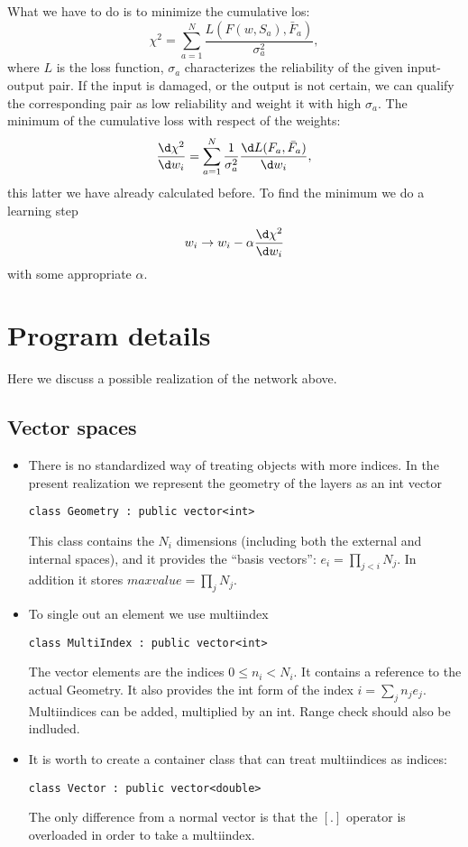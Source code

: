 \documentclass{article}
\begin{document}
What we have to do is to minimize the cumulative los:
\begin{equation}
  \chi^2 = \sum_{a=1}^N \frac{L(F(w,S_a),\bar F_a)}{\sigma_a^2},
\end{equation}
where $L$ is the loss function, $\sigma_a$ characterizes the
reliability of the given input-output pair. If the input is damaged,
or the output is not certain, we can qualify the corresponding pair as
low reliability and weight it with high $\sigma_a$. The minimum of the
cumulative loss with respect of the weights:
\begin{equation}
  \frac{\d\chi^2}{\d w_i} = \sum_{a=1}^N \frac{1}{\sigma_a^2}
  \frac{\d L(F_a,\bar F_a)}{\d w_i},
\end{equation}
this latter we have already calculated before. To find the minimum we
do a learning step
\begin{equation}
  w_i \to w_i - \alpha \frac{\d\chi^2}{\d w_i} 
\end{equation}
with some appropriate $\alpha$. 


\section{Program details}

Here we discuss a possible realization of the network above.

\subsection{Vector spaces}

\begin{itemize}
\item There is no standardized way of treating objects with more indices. In
  the present realization we represent the geometry of the layers as
  an int vector 
  \begin{center}
    \texttt{class Geometry : public vector<int>}  
  \end{center}
  This class contains the $N_i$ dimensions (including both the
  external and internal spaces), and it provides the ``basis
  vectors'': $e_i = \prod_{j<i} N_j$. In addition it stores
  $maxvalue=\prod_j N_j$.
\item To single out an element we use multiindex
  \begin{center}
    \texttt{class MultiIndex : public vector<int>}  
  \end{center}
  The vector elements are the indices $0\le n_i<N_i$. It contains a
  reference to the actual Geometry. It also provides the int form of
  the index $i=\sum_j n_j e_j$. Multiindices can be added, multiplied
  by an int. Range check should also be indluded.
\item It is worth to create a container class that can treat
  multiindices as indices:
  \begin{center}
    \texttt{class Vector : public vector<double>}
  \end{center}
  The only difference from a normal vector is that the $[.]$ operator
  is overloaded in order to take a multiindex.
\end{itemize}
\end{document}
